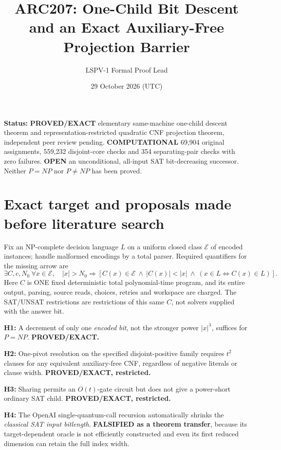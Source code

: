 \documentclass[11pt]{article}
\title{ARC207: One-Child Bit Descent and an Exact Auxiliary-Free Projection Barrier}
\author{LSPV-1 Formal Proof Lead}
\date{29 October 2026 (UTC)}
\begin{document}
\maketitle
\noindent\textbf{Status:} \textbf{PROVED/EXACT} elementary same-machine one-child descent theorem and representation-restricted quadratic CNF projection theorem, independent peer review pending. \textbf{COMPUTATIONAL} 69,904 original assignments, 559,232 disjoint-core checks and 354 separating-pair checks with zero failures. \textbf{OPEN} an unconditional, all-input SAT bit-decreasing successor. Neither $P=NP$ nor $P\ne NP$ has been proved.

\section{Exact target and proposals made before literature search}
Fix an NP-complete decision language $L$ on a uniform closed class $\mathcal E$ of encoded instances; handle malformed encodings by a total parser. Required quantifiers for the missing arrow are
\[
\exists C,c,N_0\ \forall x\in\mathcal E,\quad
 |x|>N_0\Longrightarrow
 [C(x)\in\mathcal E\ \land\ |C(x)|<|x|\
 \land\ (x\in L\Longleftrightarrow C(x)\in L)].
\]
Here $C$ is ONE fixed deterministic total polynomial-time program, and its entire output, parsing, source reads, choices, retries and workspace are charged. The SAT/UNSAT restrictions are restrictions of this same $C$, not solvers supplied with the answer bit.

\noindent\textbf{H1:} A decrement of only one \emph{encoded bit}, not the stronger power $|x|^\lambda$, suffices for $P=NP$. \textbf{PROVED/EXACT.}

\noindent\textbf{H2:} One-pivot resolution on the specified disjoint-positive family requires $t^2$ clauses for any equivalent auxiliary-free CNF, regardless of negative literals or clause width. \textbf{PROVED/EXACT, restricted.}

\noindent\textbf{H3:} Sharing permits an $O(t)$-gate circuit but does not give a power-short ordinary SAT child. \textbf{PROVED/EXACT, restricted.}

\noindent\textbf{H4:} The OpenAI single-quantum-call recursion automatically shrinks the \emph{classical SAT input bitlength}. \textbf{FALSIFIED as a theorem transfer}, because its target-dependent oracle is not efficiently constructed and even its first reduced dimension can retain the full index width.
\end{document}
